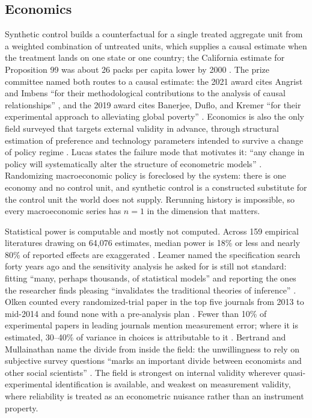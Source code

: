 \documentclass{article}
\begin{document}
\subsection{Economics}

Synthetic control builds a counterfactual for a single treated aggregate unit from a weighted combination of untreated units, which supplies a causal estimate when the treatment lands on one state or one country; the California estimate for Proposition 99 was about 26 packs per capita lower by 2000 \citep{abadie2010synthetic}. The prize committee named both routes to a causal estimate: the 2021 award cites Angrist and Imbens ``for their methodological contributions to the analysis of causal relationships'' \citep{nobel2021economic}, and the 2019 award cites Banerjee, Duflo, and Kremer ``for their experimental approach to alleviating global poverty'' \citep{nobel2019economic}. Economics is also the only field surveyed that targets external validity in advance, through structural estimation of preference and technology parameters intended to survive a change of policy regime \citep{lucas1976econometric}. Lucas states the failure mode that motivates it: ``any change in policy will systematically alter the structure of econometric models'' \citep{lucas1976econometric}. Randomizing macroeconomic policy is foreclosed by the system: there is one economy and no control unit, and synthetic control is a constructed substitute for the control unit the world does not supply. Rerunning history is impossible, so every macroeconomic series has $n = 1$ in the dimension that matters.

Statistical power is computable and mostly not computed. Across 159 empirical literatures drawing on 64,076 estimates, median power is 18\% or less and nearly 80\% of reported effects are exaggerated \citep{ioannidis2017power}. Leamer named the specification search forty years ago and the sensitivity analysis he asked for is still not standard: fitting ``many, perhaps thousands, of statistical models'' and reporting the ones the researcher finds pleasing ``invalidates the traditional theories of inference'' \citep{leamer1983lets}. Olken counted every randomized-trial paper in the top five journals from 2013 to mid-2014 and found none with a pre-analysis plan \citep{olken2015promises}. Fewer than 10\% of experimental papers in leading journals mention measurement error; where it is estimated, 30--40\% of variance in choices is attributable to it \citep{gillen2019experimenting}. Bertrand and Mullainathan name the divide from inside the field: the unwillingness to rely on subjective survey questions ``marks an important divide between economists and other social scientists'' \citep{bertrand2001people}. The field is strongest on internal validity wherever quasi-experimental identification is available, and weakest on measurement validity, where reliability is treated as an econometric nuisance rather than an instrument property.
\end{document}
